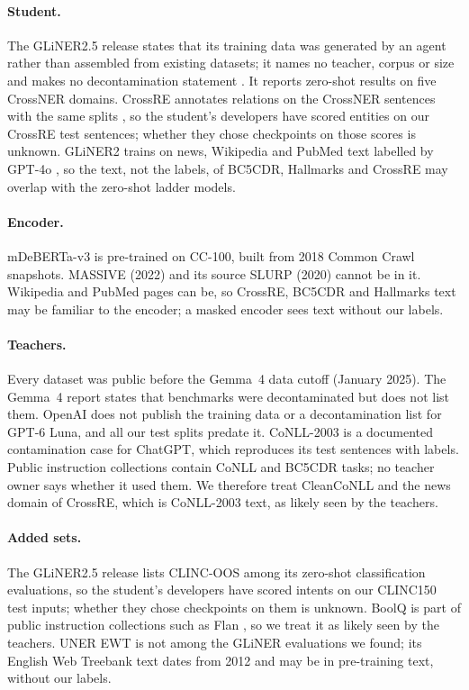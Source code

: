 \documentclass[11pt]{article}
\begin{document}
\paragraph{Student.} The GLiNER2.5 release states that its training data was generated by an agent rather than assembled from existing datasets; it names no teacher, corpus or size and makes no decontamination statement \citep{gliner25multi}. It reports zero-shot results on five CrossNER domains. CrossRE annotates relations on the CrossNER sentences with the same splits \citep{crossre2022}, so the student's developers have scored entities on our CrossRE test sentences; whether they chose checkpoints on those scores is unknown. GLiNER2 trains on news, Wikipedia and PubMed text labelled by GPT-4o \citep{gliner2_2025}, so the text, not the labels, of BC5CDR, Hallmarks and CrossRE may overlap with the zero-shot ladder models.

\paragraph{Encoder.} mDeBERTa-v3 is pre-trained on CC-100, built from 2018 Common Crawl snapshots. MASSIVE (2022) and its source SLURP (2020) cannot be in it. Wikipedia and PubMed pages can be, so CrossRE, BC5CDR and Hallmarks text may be familiar to the encoder; a masked encoder sees text without our labels.

\paragraph{Teachers.} Every dataset was public before the Gemma~4 data cutoff (January 2025). The Gemma~4 report states that benchmarks were decontaminated but does not list them. OpenAI does not publish the training data or a decontamination list for GPT-6 Luna, and all our test splits predate it. CoNLL-2003 is a documented contamination case for ChatGPT, which reproduces its test sentences with labels. Public instruction collections contain CoNLL and BC5CDR tasks; no teacher owner says whether it used them. We therefore treat CleanCoNLL and the news domain of CrossRE, which is CoNLL-2003 text, as likely seen by the teachers.

\paragraph{Added sets.} The GLiNER2.5 release lists CLINC-OOS among its zero-shot classification evaluations, so the student's developers have scored intents on our CLINC150 test inputs; whether they chose checkpoints on them is unknown. BoolQ is part of public instruction collections such as Flan \citep{longpre2023flan}, so we treat it as likely seen by the teachers. UNER EWT is not among the GLiNER evaluations we found; its English Web Treebank text dates from 2012 and may be in pre-training text, without our labels.
\end{document}
